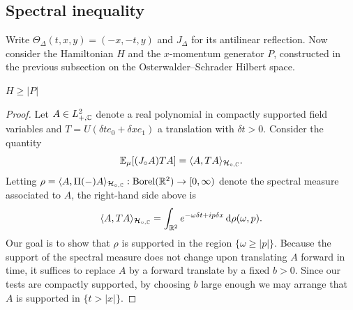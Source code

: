\subsection{Spectral inequality}
Write $\Theta_\Delta(t,x,y)=(-x,-t,y)$ and $J_\Delta$ for its
antilinear reflection. Now consider the Hamiltonian $H$ and the
$x$-momentum generator $P$, constructed in the previous subsection
on the Osterwalder--Schrader Hilbert space.
\begin{proposition}\label{prop:cone}
    $H\geq |P|$
\end{proposition}
\begin{proof}
    Let $A\in L^2_{+,\mathbb{C}}$ denote a real polynomial in compactly supported field variables and $T=U(\delta t e_0+\delta x e_1)$ a translation with $\delta t>0$. Consider the quantity 
    \begin{equation}
        \mathbb{E}_\mu [(J_\circ A) T A]=\langle A,TA\rangle_{\mathcal{H}_{\circ,\mathbb{C}}}.
    \end{equation}
    Letting $\rho = \langle A,  \Pi(-) A \rangle_{\mathcal{H}_{\circ,\mathbb{C}}} :\operatorname{Borel}(\mathbb{R}^2)\to [0,\infty)$ denote the spectral measure associated to $A$, the right-hand side above is 
    \begin{equation}
        \langle A,T A \rangle_{\mathcal{H}_{\circ,\mathbb{C}}} =  \int_{\mathbb{R}^2} e^{-\omega \delta t + i p \delta x} \,\mathrm{d} \rho(\omega, p).
    \end{equation}
    Our goal is to show that $\rho$ is supported in the region $\{\omega\geq |p|\}$. Because the support of the spectral measure does not change upon translating $A$ forward in time, it suffices to replace $A$ by a 
    forward translate by a fixed $b>0$. Since our tests are compactly supported, by choosing $b$ large enough we may arrange that $A$ is supported in $\{t>|x|\}$. 


\end{proof}
